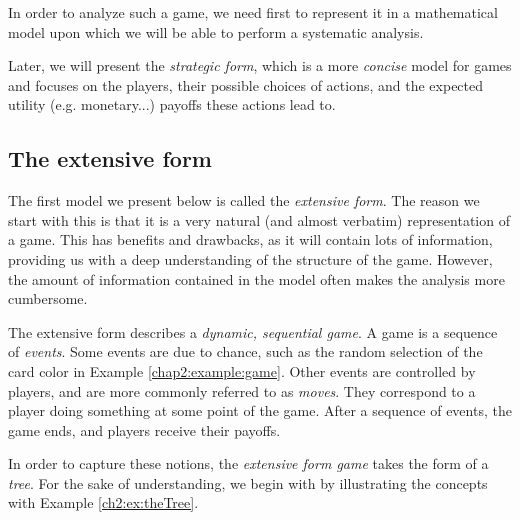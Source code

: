 In order to analyze such a game, we need first to represent it in a mathematical model upon which we will be able to perform a systematic analysis.



 Later, we will present the   \emph{strategic form}, which is a more \emph{concise} model for games and focuses on the players,  their possible choices of actions, and the expected utility (e.g. monetary...) payoffs  these actions lead to.


\subsection{The extensive form}
\label{subsec:ExtForm}
The first model we present below is called the \emph{extensive form}.
The reason we start with this is that it is a very natural (and almost verbatim) representation of a game.  This has benefits and drawbacks, as it will contain lots of information,  providing us with a deep understanding of the structure of the game. However,  the amount of information  contained in the model
 often makes the analysis more cumbersome.


The extensive form describes a \emph{dynamic, sequential game}. A game is a sequence of \emph{events}.
Some events are due to chance, such as the random selection of the card color in Example \ref{chap2:example:game}.
Other events are controlled by players, and are more commonly referred to as \emph{moves}.
They correspond to a player doing something at some point of the game.
After a sequence of events, the game ends, and players receive their payoffs.

In order to capture these notions, the \emph{extensive form game} takes the form of a \emph{tree}.
 For the sake of understanding, we begin with by illustrating the concepts with Example \ref{ch2:ex:theTree}.


